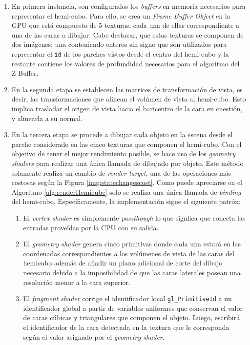 \begin{enumerate}
	\item En primera instancia, son configurados los \textit{buffers} en memoria necesarios para representar el hemi-cubo.
	Para ello, se crea un \textit{Frame Buffer Object} en la GPU que está compuesto de 5 texturas, cada una de ellas correspondiente a una de las caras a dibujar. Cabe destacar, que estas texturas se componen de dos imágenes: una conteniendo enteros sin signo que son utilizados para representar el \verb|id| de los parches vistos desde el centro del hemi-cubo y la restante contiene los valores de profundidad necesarios para el algoritmo del Z-Buffer.
	\item En la segunda etapa se establecen las matrices de transformación de vista, es decir, las transformaciones que alinean el volúmen de vista al hemi-cubo. Esto implica trasladar el origen de vista hacia el baricentro de la cara en cuestión, y alinearla a su normal.
	\item En la tercera etapa se procede a dibujar cada objeto en la escena desde el parche considerado en las cinco texturas que componen el hemi-cubo. Con el objetivo de tener el mejor rendimiento posible, se hace uso de los \textit{geometry shaders} para realizar una única llamada de dibujado por objeto. Este método solamente realiza un cambio de \textit{render target}, una de las operaciones más costosas según la Figura \ref{img:statechangescost}. Como puede apreciarse en el Algoritmo \ref{alg:renderHemicube} solo se realiza una única llamada de \textit{binding} del hemi-cubo. Específicamente, la implementación sigue el siguiente patrón:

	\begin{enumerate}
		\item El \textit{vertex shader} es simplemente \textit{passthough} lo que signfica que conecta las entradas proveídas por la CPU con su salida.
		\item El \textit{geometry shader} genera cinco primitivas donde cada una estará en las coordenadas correspondientes a los volúmenes de vista de las caras del hemicubo además de añadir un plano adicional de corte del dibujo necesario debido a la imposibilidad de que las caras laterales posean una resolución menor a la cara superior.
		\item El \textit{fragment shader} corrige el identificador local \verb|gl_PrimitiveId| a un identificador global a partir de variables uniformes que conservan el valor de caras cúbicas y triangulares que componen el objeto. Luego, escribirá el identificador de la cara detectada en la textura que le corresponda según el valor asignado por el \textit{geometry shader}.
	\end{enumerate}
	\begin{algorithm}


\end{algorithm}
\end{enumerate}
